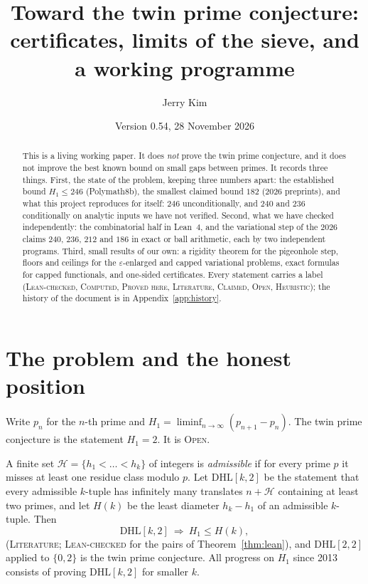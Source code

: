 \documentclass[11pt]{amsart}
\title[Toward the twin prime conjecture]{Toward the twin prime conjecture: certificates, limits of the sieve, and a working programme}
\author{Jerry Kim}
\date{Version 0.54, 28 November 2026}
\theoremstyle{definition}
\theoremstyle{remark}
\newcommand{\lbl}[1]{\textup{\textsc{#1}}}
\newcommand{\DHL}{\mathrm{DHL}}
\begin{document}
\begin{abstract}
This is a living working paper. It does \emph{not} prove the twin prime
conjecture, and it does not improve the best known bound on small gaps between
primes. It records three things. First, the state of the problem, keeping three
numbers apart: the established bound $H_1\le246$ (Polymath8b), the smallest
claimed bound $182$ (2026 preprints), and what this project reproduces for
itself: $246$ unconditionally, and $240$ and $236$ conditionally on analytic
inputs we have not verified. Second, what we have checked independently: the
combinatorial half in Lean~4, and the variational step of the 2026 claims
$240$, $236$, $212$ and $186$ in exact or ball arithmetic, each by two
independent programs. Third, small results of our own: a rigidity theorem for
the pigeonhole step, floors and ceilings for the $\varepsilon$-enlarged and
capped variational problems, exact formulas for capped functionals, and
one-sided certificates. Every statement carries a label (\lbl{Lean-checked},
\lbl{Computed}, \lbl{Proved here}, \lbl{Literature}, \lbl{Claimed},
\lbl{Open}, \lbl{Heuristic}); the history of the document is in
Appendix~\ref{app:history}.
\end{abstract}

\maketitle
\setcounter{tocdepth}{1}
\tableofcontents

\section{The problem and the honest position}

Write $p_n$ for the $n$-th prime and $H_1=\liminf_{n\to\infty}(p_{n+1}-p_n)$.
The twin prime conjecture is the statement $H_1=2$. It is \lbl{Open}.

A finite set $\mathcal H=\{h_1<\dots<h_k\}$ of integers is \emph{admissible} if
for every prime $p$ it misses at least one residue class modulo $p$. Let
$\DHL[k,2]$ be the statement that every admissible $k$-tuple has infinitely
many translates $n+\mathcal H$ containing at least two primes, and let $H(k)$
be the least diameter $h_k-h_1$ of an admissible $k$-tuple. Then
\begin{equation}\label{eq:reduction}
\DHL[k,2]\ \Longrightarrow\ H_1\le H(k),
\end{equation}
(\lbl{Literature}; \lbl{Lean-checked} for the pairs of Theorem~\ref{thm:lean}),
and $\DHL[2,2]$ applied to $\{0,2\}$ is the twin prime conjecture. All progress
on $H_1$ since 2013 consists of proving $\DHL[k,2]$ for smaller $k$.
\end{document}
